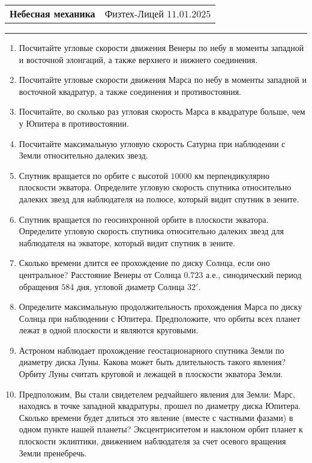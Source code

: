 \documentclass[12pt]{article}
\begin{document}
\begin{tabularx}{\textwidth}{Xr}
{\Large \textbf{Небесная механика}} & Физтех-Лицей $11.01.2025$ \\
\end{tabularx}
\noindent\rule{\textwidth}{0.4pt}
\begin{enumerate}
    \item Посчитайте угловые скорости движения Венеры по небу в моменты западной и восточной элонгаций, а также верхнего и нижнего соединения.
    \item Посчитайте угловые скорости движения Марса по небу в моменты западной и восточной квадратур, а также соединения и противостояния.
    \item Посчитайте, во сколько раз угловая скорость Марса в квадратуре больше, чем у Юпитера в противостоянии.
    \item Посчитайте максимальную угловую скорость Сатурна при наблюдении с Земли относительно далеких звезд.
    \item Спутник вращается по орбите с высотой $10000$ км перпендикулярно плоскости экватора. Определите угловую скорость спутника относительно далеких звезд для наблюдателя на полюсе, который видит спутник в зените.
    \item Спутник вращается по геосинхронной орбите в плоскости экватора. Определите угловую скорость спутника относительно далеких звезд для наблюдателя на экваторе, который видит спутник в зените.
    \item Сколько времени длится ее прохождение по диску Солнца, если оно центральное? Расстояние Венеры от Солнца $0.723$ а.е., синодический период обращения $584$ дня, угловой диаметр Солнца $32'$.
    \item Определите максимальную продолжительность прохождения Марса по диску Солнца при наблюдении с Юпитера. Предположите, что орбиты всех планет лежат в одной плоскости и являются круговыми.
    \item Астроном наблюдает прохождение геостационарного спутника Земли по диаметру диска Луны. Какова может быть длительность такого явления? Орбиту Луны считать круговой и лежащей в плоскости экватора Земли. 
    \item Предположим, Вы стали свидетелем редчайшего явления для Земли: Марс, находясь в точке западной квадратуры, прошел по диаметру диска Юпитера. Сколько времени будет длиться это явление (вместе с частными фазами) в одном пункте нашей планеты? Эксцентриситетом и наклоном орбит планет к плоскости эклиптики, движением наблюдателя за счет осевого вращения Земли пренебречь.

\end{enumerate}
\end{document}
